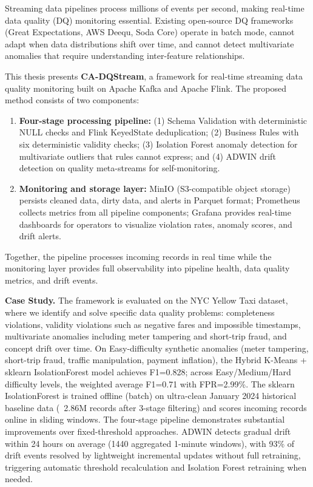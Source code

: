 \documentclass[a4paper, reqno, oneside]{book}
\begin{document}
\noindent Streaming data pipelines process millions of events per second, making real-time data quality (DQ) monitoring essential. Existing open-source DQ frameworks (Great Expectations, AWS Deequ, Soda Core) operate in batch mode, cannot adapt when data distributions shift over time, and cannot detect multivariate anomalies that require understanding inter-feature relationships.

This thesis presents \textbf{CA-DQStream}, a framework for real-time streaming data quality monitoring built on Apache Kafka and Apache Flink. The proposed method consists of two components:

\begin{enumerate}
    \item \textbf{Four-stage processing pipeline:} (1) Schema Validation with deterministic NULL checks and Flink KeyedState deduplication; (2) Business Rules with six deterministic validity checks; (3) Isolation Forest anomaly detection for multivariate outliers that rules cannot express; and (4) ADWIN drift detection on quality meta-streams for self-monitoring.
    \item \textbf{Monitoring and storage layer:} MinIO (S3-compatible object storage) persists cleaned data, dirty data, and alerts in Parquet format; Prometheus collects metrics from all pipeline components; Grafana provides real-time dashboards for operators to visualize violation rates, anomaly scores, and drift alerts.
\end{enumerate}

Together, the pipeline processes incoming records in real time while the monitoring layer provides full observability into pipeline health, data quality metrics, and drift events.

\textbf{Case Study.} The framework is evaluated on the NYC Yellow Taxi dataset, where we identify and solve specific data quality problems: completeness violations, validity violations such as negative fares and impossible timestamps, multivariate anomalies including meter tampering and short-trip fraud, and concept drift over time. On Easy-difficulty synthetic anomalies (meter tampering, short-trip fraud, traffic manipulation, payment inflation), the Hybrid K-Means + sklearn IsolationForest model achieves F1=0.828; across Easy/Medium/Hard difficulty levels, the weighted average F1=0.71 with FPR=2.99\%. The sklearn IsolationForest is trained offline (batch) on ultra-clean January 2024 historical baseline data (~2.86M records after 3-stage filtering) and scores incoming records online in sliding windows. The four-stage pipeline demonstrates substantial improvements over fixed-threshold approaches. ADWIN detects gradual drift within 24 hours on average (1440 aggregated 1-minute windows), with 93\% of drift events resolved by lightweight incremental updates without full retraining, triggering automatic threshold recalculation and Isolation Forest retraining when needed.
\end{document}

